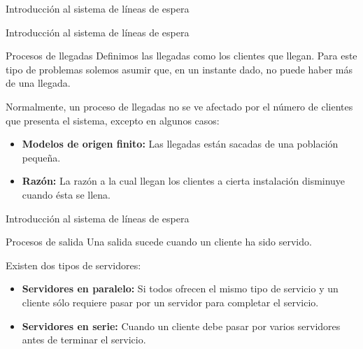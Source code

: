 \begin{frame}
	\centering \LARGE \color{naranjaUCA} Introducción al sistema de líneas de espera
\end{frame}
\begin{frame}{Introducción al sistema de líneas de espera}
	\begin{block}{Procesos de llegadas}
		Definimos las llegadas como los clientes que llegan. Para este tipo de problemas solemos asumir que, en un instante dado, no puede haber más de una llegada.
	\end{block}
	\pause
	Normalmente, un proceso de llegadas no se ve afectado por el número de clientes que presenta el sistema, excepto en algunos casos:
	\begin{itemize}
		\pause
		\item \textbf{Modelos de origen finito:} Las llegadas están sacadas de una población pequeña.
		\pause
		\item \textbf{Razón:} La razón a la cual llegan los clientes a cierta instalación disminuye cuando ésta se llena.
	\end{itemize} 
\end{frame}


\begin{frame}{Introducción al sistema de líneas de espera}
	\begin{block}{Procesos de salida}
		Una salida sucede cuando un cliente ha sido servido.
	\end{block}
	
	\pause
	Existen dos tipos de servidores:
	\begin{itemize}
		\pause
		\item \textbf{Servidores en paralelo:} Si todos ofrecen el mismo tipo de servicio y un cliente sólo requiere pasar por un servidor para completar el servicio.
		\pause
		\item\textbf{Servidores en serie:} Cuando un cliente debe pasar por varios servidores antes de terminar el servicio.
	\end{itemize}
\end{frame}

